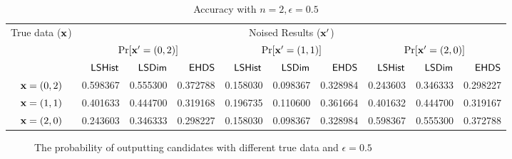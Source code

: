 \documentclass{article}
\begin{document}
\begin{table}[htbp]
	\vspace{-0.8cm}
	\tiny
	\centering
	\caption{\footnotesize Accuracy with $n = 2, \epsilon = 0.5$}
	\label{tab_n2eps0.5prob}
	\vspace{-0.2cm}
\begin{tabular}{|c||r|r|r|r|r|r|r|r|r|}
	\hline

	\multirow{3}{*}{True data ($\textbf{x}$)} 	
								&  \multicolumn{9}{c|}{Noised Results ($\textbf{x}'$)}  		
								\\ \cline{2-10}
	                      		&  \multicolumn{3}{c|}{$\Pr[\textbf{x}' = (0, 2)]$}  	
	                      		&  \multicolumn{3}{c|}{$\Pr[\textbf{x}' = (1, 1)]$} 	
	                      		&  \multicolumn{3}{c|}{$\Pr[\textbf{x}' = (2, 0)]$} 	\\
	                      		\cline{2-10}
						        & $\mathsf{LSHist}$	
								& $\mathsf{LSDim}$
								& $\mathsf{EHDS}$
								& $\mathsf{LSHist}$
								& $\mathsf{LSDim}$	
								& $\mathsf{EHDS}$
								& $\mathsf{LSHist}$
								& $\mathsf{LSDim}$
								& $\mathsf{EHDS}$\\
	                      		\hline \hline
	$\textbf{x} = (0,2)$          & 0.598367
								& 0.555300
								& 0.372788
								& 0.158030
								& 0.098367	
								& 0.328984 
								& 0.243603
								& 0.346333
								& 0.298227
								\\  \hline
	$\textbf{x} = (1,1)$          & 0.401633
								& 0.444700
								& 0.319168
								& 0.196735
								& 0.110600
								& 0.361664
								& 0.401632
								& 0.444700
								& 0.319167
								\\  \hline
	$\textbf{x} = (2,0)$          & 0.243603
								& 0.346333
								& 0.298227
								& 0.158030
								& 0.098367	
								& 0.328984 
								& 0.598367
								& 0.555300
								& 0.372788
								\\  \hline
\end{tabular}
\end{table}

\begin{figure*}[ht]
\begin{center}
\vspace{-0.5cm}
     \centering
      \caption{\footnotesize The probability of outputting candidates with different true data and $\epsilon = 0.5$}
\vspace{-0.5cm}
\end{center}
\end{figure*}
\end{document}
